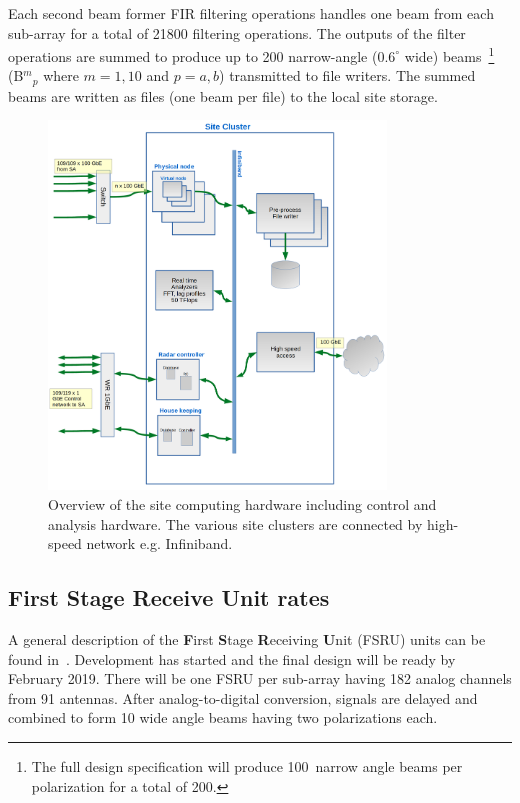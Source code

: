 \documentclass[12pt,a4paper]{article}
\begin{document}
Each second beam former FIR filtering operations handles one beam from each sub-array for a total of 21800 filtering operations.
The outputs of the filter operations are summed to produce up to 200 narrow-angle ($0.6^{\circ}$ wide) beams~\footnote{The full \ED design specification will produce 100~narrow angle beams per polarization for a total of 200.}  (B${^m}{_p}$ where $m=1,10$ and $p=a,b$) 
transmitted to file writers.
The summed beams are written as files (one beam per file) to the local site storage.
\begin{figure}
\centering
\includegraphics[width=0.8\textwidth]{E3D_dataflow_3aa.png}
\caption{Overview of the site computing hardware including control and analysis hardware. The various site clusters are connected by high-speed network e.g. Infiniband. \label{fig:sitecluster}}
\end{figure}


\subsection{First Stage Receive Unit rates}
\label{ssec:bfrates}

A general description of the {\bf F}irst {\bf S}tage {\bf R}eceiving {\bf U}nit (FSRU) units can be found in~\cite{fsru-tender}. 
Development has started and the final design will be ready by February 2019. 
There will be one FSRU per sub-array having 182 analog channels from 91 antennas. 
After analog-to-digital conversion, signals are delayed and combined to form 10 wide angle beams having two polarizations each.
\end{document}

